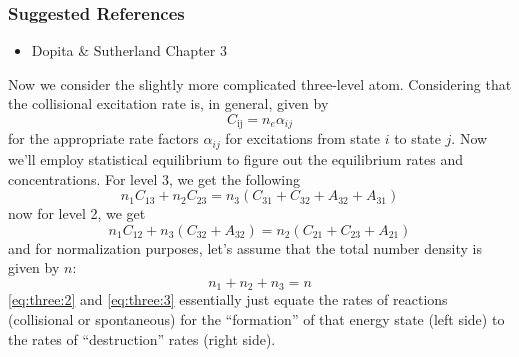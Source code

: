 \documentclass[10pt]{article}
\numberwithin{equation}{section}
\begin{document}
\subsubsection*{Suggested References} %
\label{ssub:suggested_references}
\begin{itemize}
  \item Dopita \& Sutherland Chapter 3
\end{itemize}
Now we consider the slightly more complicated three-level atom. Considering that the collisional excitation rate is, in general, given by
\begin{equation}
  \label{eq:three:1} C_{\mathrm{ij}} = n_e \alpha_{ij}
\end{equation}
for the appropriate rate factors $\alpha_{ij}$ for excitations from state $i$ to state $j$. Now we'll employ statistical equilibrium to figure out the equilibrium rates and concentrations. For level 3, we get the following
\begin{equation}
  \label{eq:three:2} n_1C_{13} + n_2 C_{23} = n_3(C_{31} + C_{32} + A_{32} + A_{31})
\end{equation}
now for level 2, we get
\begin{equation}
  \label{eq:three:3} n_1 C_{12} + n_3(C_{32} + A_{32}) = n_2(C_{21} + C_{23} + A_{21})
\end{equation}
and for normalization purposes, let's assume that the total number density is given by $n$:
\begin{equation}
  \label{eq:three:4} n_1 + n_2 + n_3 = n
\end{equation}
\eqref{eq:three:2} and \eqref{eq:three:3} essentially just equate the rates of reactions (collisional or spontaneous) for the ``formation'' of that energy state (left side) to the rates of ``destruction'' rates (right side).\\
\end{document}
